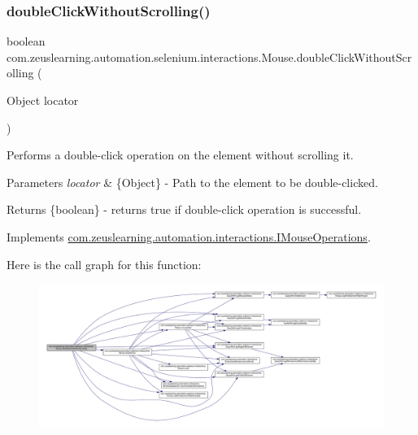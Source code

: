 \subsubsection{\texorpdfstring{double\+Click\+Without\+Scrolling()}{doubleClickWithoutScrolling()}}
{\footnotesize\ttfamily boolean com.\+zeuslearning.\+automation.\+selenium.\+interactions.\+Mouse.\+double\+Click\+Without\+Scrolling (\begin{DoxyParamCaption}\item[{Object}]{locator }\end{DoxyParamCaption})\hspace{0.3cm}{\ttfamily [inline]}}

Performs a double-\/click operation on the element without scrolling it.


\begin{DoxyParams}{Parameters}
{\em locator} & \{Object\} -\/ Path to the element to be double-\/clicked.\\
\hline
\end{DoxyParams}
\begin{DoxyReturn}{Returns}
\{boolean\} -\/ returns {\ttfamily true} if double-\/click operation is successful. 
\end{DoxyReturn}


Implements \hyperlink{interfacecom_1_1zeuslearning_1_1automation_1_1interactions_1_1IMouseOperations_ace17e5ec881803e96a75495cc4d532ff}{com.\+zeuslearning.\+automation.\+interactions.\+I\+Mouse\+Operations}.

Here is the call graph for this function\+:
\nopagebreak
\begin{figure}[H]
\begin{center}
\leavevmode
\includegraphics[width=350pt]{d0/dfa/classcom_1_1zeuslearning_1_1automation_1_1selenium_1_1interactions_1_1Mouse_aaab22a7e838b862a7e7e02879d5622d2_cgraph}
\end{center}
\end{figure}
\hypertarget{classcom_1_1zeuslearning_1_1automation_1_1selenium_1_1interactions_1_1Mouse_a82e9cde3b736af28bad478dbf2d69889}{}\label{classcom_1_1zeuslearning_1_1automation_1_1selenium_1_1interactions_1_1Mouse_a82e9cde3b736af28bad478dbf2d69889} 
